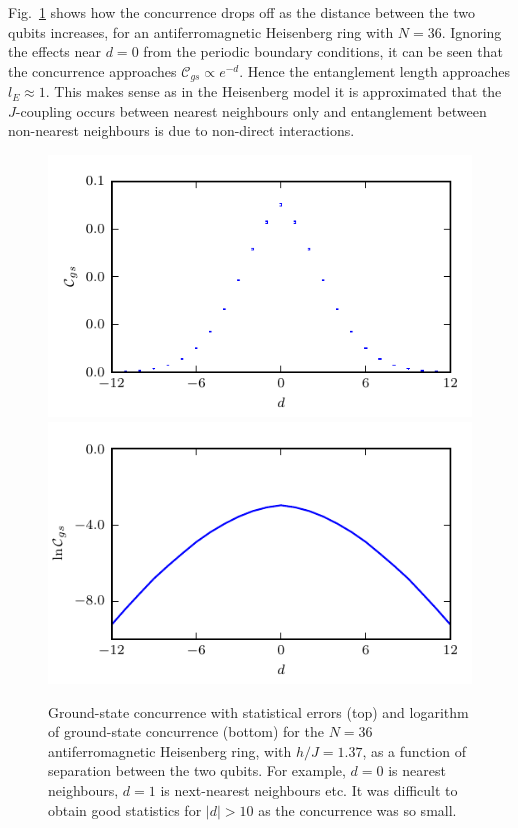 Fig.~\ref{fig:concurrence36ChainSeparation} shows how the concurrence drops off as the distance between the two qubits increases, for an antiferromagnetic Heisenberg ring with $N=36$. Ignoring the effects near $d=0$ from the periodic boundary conditions, it can be seen that the concurrence approaches $\mathcal{C}_{gs} \propto e^{-d}$. Hence the entanglement length approaches $l_E \approx 1$. This makes sense as in the Heisenberg model it is approximated that the $J$-coupling occurs between nearest neighbours only and entanglement between non-nearest neighbours is due to non-direct interactions.
\begin{figure}[H]
\begin{center}
\includegraphics[width =1\textwidth]{36_chain_concurrence.pdf}\\
\includegraphics[width =1\textwidth]{36_log_chain_concurrence.pdf}
\caption[Ground-state concurrence with statistical errors (top) and logarithm of ground-state concurrence (bottom) for the $N=36$ antiferromagnetic Heisenberg ring, with $h/J  = 1.37$, as a function of separation between the two qubits.]{Ground-state concurrence with statistical errors (top) and logarithm of ground-state concurrence (bottom) for the $N=36$ antiferromagnetic Heisenberg ring, with $h/J  = 1.37$, as a function of separation between the two qubits. For example, $d=0$ is nearest neighbours, $d=1$ is next-nearest neighbours etc. It was difficult to obtain good statistics for $\lvert d\rvert > 10$ as the concurrence was so small. }
\label{fig:concurrence36ChainSeparation}
\end{center}
\end{figure}

